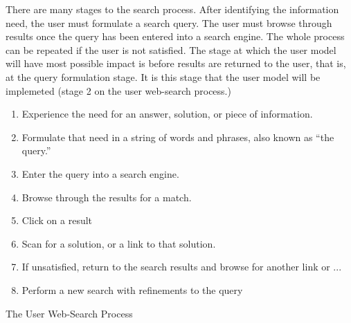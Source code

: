 \documentclass[a4paper, 11pt]{article}
\begin{document}
There are many stages to the search process. After identifying the information need, the user must formulate a search query. The user must browse through results once the query has been entered into a search engine. The whole process can be repeated if the user is not satisfied. The stage at which the user model will have most possible impact is before results are returned to the user, that is, at the query formulation stage. It is this stage that the user model will be implemeted (stage 2 on the user web-search process.)


\begin{center}
\begin{enumerate}
\item{Experience the need for an answer,
solution, or piece of information.}
\item{Formulate that need in a string of words and phrases, also known as “the query.”}
\item{Enter the query into a search engine.}
\item{Browse through the results for a match.}
\item{Click on a result}
\item{Scan for a solution, or a link to that solution.}
\item{If unsatisfied, return to the search results and browse for another link or ...}
\item{Perform a new search with refinements to the query}
\label{search flows}
\end {enumerate}

\hspace{1.5cm}
The User Web-Search Process \cite{seo}

\end{center}
\end{document}
